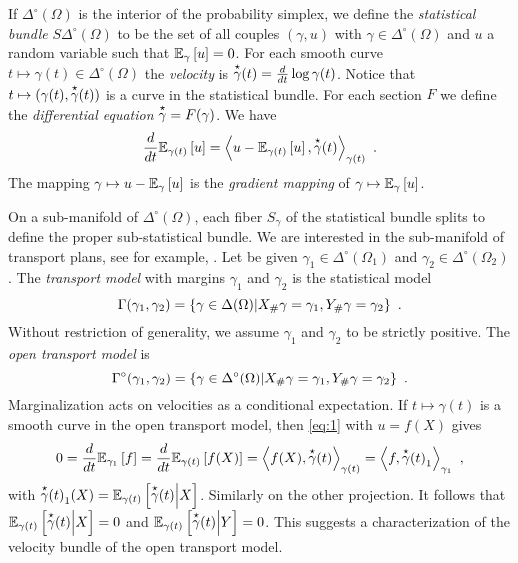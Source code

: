 \documentclass[runningheads]{llncs}
\begin{document}
If $\Delta^\circ(\Omega)$ is the interior of the probability simplex, we define the \emph{statistical bundle}
$S\Delta^\circ(\Omega)$ to be the set of all couples $(\gamma,u)$ with
$\gamma \in \Delta^\circ(\Omega)$ and $u$ a random variable such that
$\expectat \gamma u = 0$. For each smooth curve
$t \mapsto \gamma(t) \in \Delta^\circ(\Omega)$ the \emph{velocity} is 
$\velocity \gamma(t) = \derivby t \log \gamma(t)$. Notice that $t \mapsto (\gamma(t),\velocity \gamma(t))$ is a curve in the statistical bundle. For each section $F$ we define the \emph{differential equation} $\velocity \gamma = F(\gamma)$. We have
\begin{equation} 
\label{eq:1}
  \derivby t \expectat {\gamma(t)} u = \scalarat {\gamma(t)} {u - \expectat {\gamma(t)} u} {\velocity
  \gamma(t)} \ .
\end{equation}
The mapping $\gamma \mapsto u - \expectat \gamma u$ is the
\emph{gradient mapping} of $\gamma \mapsto \expectat \gamma u$.

On a sub-manifold of $\Delta^\circ(\Omega)$, each fiber $S_\gamma$ of the
statistical bundle splits to define the proper sub-statistical bundle. 
We are interested in the sub-manifold of transport plans, see for example, \cite{santambrogio:2015otap}. Let be given
$\gamma_1 \in \Delta^\circ(\Omega_1)$ and
$\gamma_2 \in \Delta^\circ(\Omega_2)$. The \emph{transport model}
with margins $\gamma_1$ and $\gamma_2$ is the statistical model
%
  \begin{equation*}
    \Gamma(\gamma_1,\gamma_2) = \setof{\gamma \in \Delta(\Omega)}{X_\# \gamma = \gamma_1, Y_\# \gamma = \gamma_2} \ .
  \end{equation*}
%
  Without restriction of generality, we assume $\gamma_1$ and
  $\gamma_2$ to be strictly positive. The \emph{open transport model}
  is
%
  \begin{equation*}
    \Gamma^\circ(\gamma_1,\gamma_2) = \setof{\gamma \in \Delta^\circ(\Omega)}{X_\# \gamma = \gamma_1, Y_\# \gamma = \gamma_2} \ .
  \end{equation*}
  Marginalization acts on velocities as a conditional expectation. If
  $t \mapsto \gamma(t)$ is a smooth curve in the open transport model,
  then \cref{eq:1} with $u = f(X)$ gives
  \begin{equation*}
  0 = \derivby t \expectat {\gamma_1} f =  \derivby t \expectat
  {\gamma(t)} {f(X)} = \scalarat {\gamma(t)}  {f(X)} {\velocity \gamma(t)}
  = \scalarat {\gamma_1}  f {{\velocity \gamma(t)}_1} \ , 
  \end{equation*}
with ${\velocity \gamma(t)}_1(X) = \condexpectat {\gamma(t)} {\velocity
  \gamma(t)} X$. Similarly on the other projection. It follows that $\condexpectat {\gamma(t)} {\velocity
  \gamma(t)} X = 0$ and $\condexpectat {\gamma(t)} {\velocity
  \gamma(t)} Y = 0$. This suggests a characterization of the velocity bundle of the open transport model.
\end{document}
